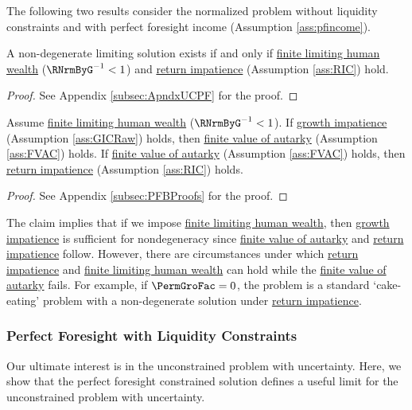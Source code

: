 \documentclass[BufferStockTheory]{subfiles}
\begin{document}
The following two results consider the normalized problem without liquidity constraints and with perfect foresight income (Assumption \ref{ass:pfincome}).

\begin{proposition}\label{prop:pfUCFHWC}
 A non-degenerate limiting solution exists if and only if \hyperlink{FHWC}{finite limiting  human wealth} ($\RNrmByG^{-1}<1$) and \hyperlink{RIC}{return impatience} (Assumption \ref{ass:RIC}) hold. 
\end{proposition}
\begin{proof}\let\qed\relax
  See Appendix \ref{subsec:ApndxUCPF} for the proof. 
\end{proof}
  

\begin{claim}\label{claim:PFConspC}
Assume \hyperlink{FHWC}{finite limiting human wealth} ($\RNrmByG^{-1}<1$). If \hyperlink{GIC}{growth impatience} (Assumption \ref{ass:GICRaw}) holds, then \hyperlink{FVAC}{finite value of autarky} (Assumption \ref{ass:FVAC}) holds. If \hyperlink{FVAC}{finite value of autarky} (Assumption \ref{ass:FVAC}) holds, then \hyperlink{RIC}{return impatience} (Assumption \ref{ass:RIC}) holds. 
\end{claim}
\begin{proof}\let\qed\relax
See Appendix \ref{subsec:PFBProofs} for the proof.
\end{proof}

The claim implies that if we impose \hyperlink{FHWC}{finite limiting  human wealth}, then  \hyperlink{GIC}{growth impatience} is sufficient for nondegeneracy since \hyperlink{FVAC}{finite value of autarky} and \hyperlink{RIC}{return impatience} follow.
However, there are circumstances under which \hyperlink{RIC}{return impatience} and \hyperlink{FHWC}{finite limiting  human wealth} can hold while the \hyperlink{FVAC}{finite value of autarky} fails.
For example, if $\PermGroFac=0$, the problem is a standard `cake-eating' problem with a non-degenerate solution under \hyperlink{RIC}{return impatience}.


\subsubsection{Perfect Foresight with Liquidity Constraints}

Our ultimate interest is in the unconstrained problem with uncertainty.
Here, we show that the perfect foresight constrained solution defines a useful limit for the unconstrained problem with uncertainty.
\end{document}
